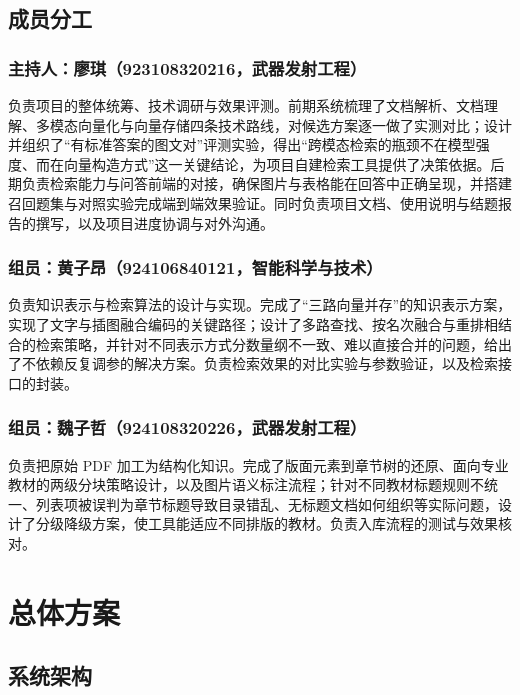 \documentclass[12pt,a4paper]{ctexart}
\begin{document}
\subsection{成员分工}

\subsubsection{主持人：廖琪（923108320216，武器发射工程）}

负责项目的整体统筹、技术调研与效果评测。前期系统梳理了文档解析、文档理解、多模态向量化与向量存储四条技术路线，对候选方案逐一做了实测对比；设计并组织了“有标准答案的图文对”评测实验，得出“跨模态检索的瓶颈不在模型强度、而在向量构造方式”这一关键结论，为项目自建检索工具提供了决策依据。后期负责检索能力与问答前端的对接，确保图片与表格能在回答中正确呈现，并搭建召回题集与对照实验完成端到端效果验证。同时负责项目文档、使用说明与结题报告的撰写，以及项目进度协调与对外沟通。

\subsubsection{组员：黄子昂（924106840121，智能科学与技术）}

负责知识表示与检索算法的设计与实现。完成了“三路向量并存”的知识表示方案，实现了文字与插图融合编码的关键路径；设计了多路查找、按名次融合与重排相结合的检索策略，并针对不同表示方式分数量纲不一致、难以直接合并的问题，给出了不依赖反复调参的解决方案。负责检索效果的对比实验与参数验证，以及检索接口的封装。

\subsubsection{组员：魏子哲（924108320226，武器发射工程）}

负责把原始 PDF 加工为结构化知识。完成了版面元素到章节树的还原、面向专业教材的两级分块策略设计，以及图片语义标注流程；针对不同教材标题规则不统一、列表项被误判为章节标题导致目录错乱、无标题文档如何组织等实际问题，设计了分级降级方案，使工具能适应不同排版的教材。负责入库流程的测试与效果核对。

\section{总体方案}

\subsection{系统架构}
\end{document}
